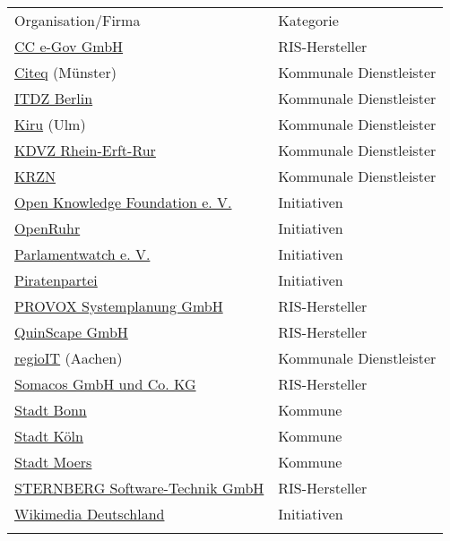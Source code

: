 \documentclass[,a4paper]{article}
\begin{document}
\begin{longtable}[c]{@{}ll@{}}
\toprule\addlinespace
Organisation/Firma & Kategorie
\\\addlinespace
\midrule\endhead
\href{http://www.cc-egov.de/}{CC e-Gov GmbH} & RIS-Hersteller
\\\addlinespace
\href{http://www.citeq.de/}{Citeq} (Münster) & Kommunale Dienstleister
\\\addlinespace
\href{http://www.itdz-berlin.de/}{ITDZ Berlin} & Kommunale Dienstleister
\\\addlinespace
\href{http://www.rz-kiru.de/}{Kiru} (Ulm) & Kommunale Dienstleister
\\\addlinespace
\href{http://www.kdvz-frechen.de/}{KDVZ Rhein-Erft-Rur} & Kommunale
Dienstleister
\\\addlinespace
\href{http://www.krzn.de/}{KRZN} & Kommunale Dienstleister
\\\addlinespace
\href{http://okfn.de/}{Open Knowledge Foundation e. V.} & Initiativen
\\\addlinespace
\href{http://openruhr.de/}{OpenRuhr} & Initiativen
\\\addlinespace
\href{http://www.abgeordnetenwatch.de/}{Parlamentwatch e. V.} &
Initiativen
\\\addlinespace
\href{http://www.piratenpartei.de/}{Piratenpartei} & Initiativen
\\\addlinespace
\href{http://www.provox.de/}{PROVOX Systemplanung GmbH} & RIS-Hersteller
\\\addlinespace
\href{http://www.quinscape.de/}{QuinScape GmbH} & RIS-Hersteller
\\\addlinespace
\href{http://www.regioit-aachen.de/}{regioIT} (Aachen) & Kommunale
Dienstleister
\\\addlinespace
\href{http://www.somacos.de/}{Somacos GmbH und Co. KG} & RIS-Hersteller
\\\addlinespace
\href{http://www.bonn.de/}{Stadt Bonn} & Kommune
\\\addlinespace
\href{http://www.stadt-koeln.de/}{Stadt Köln} & Kommune
\\\addlinespace
\href{http://www.moers.de/}{Stadt Moers} & Kommune
\\\addlinespace
\href{http://www.sitzungsdienst.net/}{STERNBERG Software-Technik GmbH} &
RIS-Hersteller
\\\addlinespace
\href{http://www.wikimedia.de/}{Wikimedia Deutschland} & Initiativen
\\\addlinespace
\bottomrule
\end{longtable}
\end{document}
